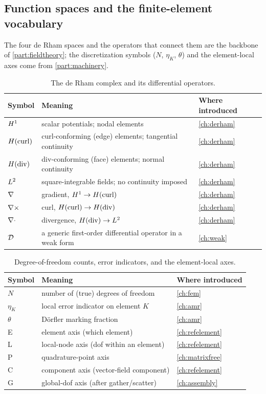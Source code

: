 \subsection{Function spaces and the finite-element vocabulary}

The four de Rham spaces and the operators that connect them are the backbone of
\cref{part:fieldtheory}; the discretization symbols ($N$, $\eta_K$, $\theta$) and
the element-local axes come from \cref{part:machinery}.

\begin{table}[ht]
\centering
\small
\caption[Function spaces and continuous operators]{The de Rham complex and its
differential operators.}
\label{tab:gl-spaces}
\begin{tabular}{@{}lll@{}}
\toprule
Symbol & Meaning & Where introduced \\
\midrule
$H^1$ & scalar potentials; nodal elements & \cref{ch:derham} \\
$H(\mathrm{curl})$ & curl-conforming (edge) elements; tangential continuity & \cref{ch:derham} \\
$H(\mathrm{div})$ & div-conforming (face) elements; normal continuity & \cref{ch:derham} \\
$L^2$ & square-integrable fields; no continuity imposed & \cref{ch:derham} \\
$\nabla$ & gradient, $H^1\to H(\mathrm{curl})$ & \cref{ch:derham} \\
$\nabla\times$ & curl, $H(\mathrm{curl})\to H(\mathrm{div})$ & \cref{ch:derham} \\
$\nabla\cdot$ & divergence, $H(\mathrm{div})\to L^2$ & \cref{ch:derham} \\
$\mathcal{D}$ & a generic first-order differential operator in a weak form & \cref{ch:weak} \\
\bottomrule
\end{tabular}
\end{table}

\begin{table}[ht]
\centering
\small
\caption[Discretization and adaptivity symbols]{Degree-of-freedom counts, error
indicators, and the element-local axes.}
\label{tab:gl-fem}
\begin{tabular}{@{}lll@{}}
\toprule
Symbol & Meaning & Where introduced \\
\midrule
$N$ & number of (true) degrees of freedom & \cref{ch:fem} \\
$\eta_K$ & local error indicator on element $K$ & \cref{ch:amr} \\
$\theta$ & D\"orfler marking fraction & \cref{ch:amr} \\
E & element axis (which element) & \cref{ch:refelement} \\
L & local-node axis (dof within an element) & \cref{ch:refelement} \\
P & quadrature-point axis & \cref{ch:matrixfree} \\
C & component axis (vector-field component) & \cref{ch:refelement} \\
G & global-dof axis (after gather/scatter) & \cref{ch:assembly} \\
\bottomrule
\end{tabular}
\end{table}

